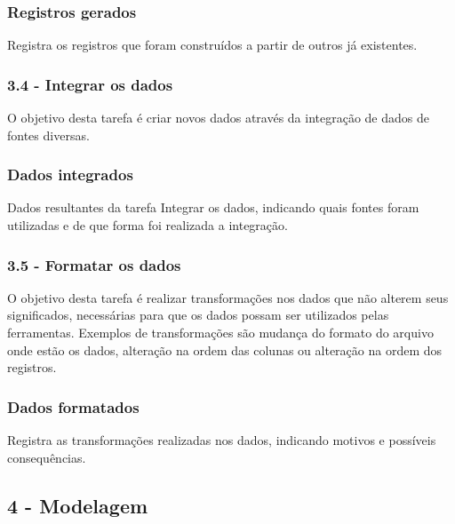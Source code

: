 \subsubsection*{Registros gerados}

Registra os registros que foram construídos a partir de outros já existentes.  

\subsubsection*{\textbf{3.4 - Integrar os dados}}

O objetivo desta tarefa é criar novos dados através da integração de dados de fontes diversas.

\subsubsection*{Dados integrados}

Dados resultantes da tarefa Integrar os dados, indicando quais fontes foram utilizadas e de que forma foi realizada a integração.

\subsubsection*{\textbf{3.5 - Formatar os dados}}

O objetivo desta tarefa é realizar transformações nos dados que não alterem seus significados, necessárias para que os dados possam ser utilizados pelas ferramentas. Exemplos de transformações são mudança do formato do arquivo onde estão os dados, alteração na ordem das colunas ou alteração na ordem dos registros.

\subsubsection*{Dados formatados}

Registra as transformações realizadas nos dados, indicando motivos e possíveis consequências.

\newpage 

\subsection*{4 - Modelagem}


